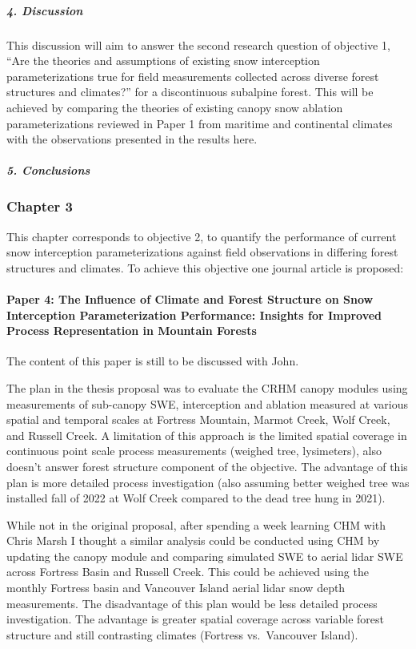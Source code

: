 \documentclass[
  letterpaper,
  DIV=11,
  numbers=noendperiod]{scrartcl}
\let\oldparagraph\paragraph
\renewcommand{\paragraph}[1]{\oldparagraph{#1}\mbox{}}
\let\oldsubparagraph\subparagraph
\renewcommand{\subparagraph}[1]{\oldsubparagraph{#1}\mbox{}}
\begin{document}
\subparagraph{4. Discussion}\label{discussion-2}

This discussion will aim to answer the second research question of
objective 1, ``Are the theories and assumptions of existing snow
interception parameterizations true for field measurements collected
across diverse forest structures and climates?'' for a discontinuous
subalpine forest. This will be achieved by comparing the theories of
existing canopy snow ablation parameterizations reviewed in Paper 1 from
maritime and continental climates with the observations presented in the
results here.

\subparagraph{5. Conclusions}\label{conclusions-1}

\subsubsection{Chapter 3}\label{chapter-3}

This chapter corresponds to objective 2, to quantify the performance of
current snow interception parameterizations against field observations
in differing forest structures and climates. To achieve this objective
one journal article is proposed:

\paragraph{Paper 4: The Influence of Climate and Forest Structure on
Snow Interception Parameterization Performance: Insights for Improved
Process Representation in Mountain
Forests}\label{paper-4-the-influence-of-climate-and-forest-structure-on-snow-interception-parameterization-performance-insights-for-improved-process-representation-in-mountain-forests}

The content of this paper is still to be discussed with John.

The plan in the thesis proposal was to evaluate the CRHM canopy modules
using measurements of sub-canopy SWE, interception and ablation measured
at various spatial and temporal scales at Fortress Mountain, Marmot
Creek, Wolf Creek, and Russell Creek. A limitation of this approach is
the limited spatial coverage in continuous point scale process
measurements (weighed tree, lysimeters), also doesn't answer forest
structure component of the objective. The advantage of this plan is more
detailed process investigation (also assuming better weighed tree was
installed fall of 2022 at Wolf Creek compared to the dead tree hung in
2021).

While not in the original proposal, after spending a week learning CHM
with Chris Marsh I thought a similar analysis could be conducted using
CHM by updating the canopy module and comparing simulated SWE to aerial
lidar SWE across Fortress Basin and Russell Creek. This could be
achieved using the monthly Fortress basin and Vancouver Island aerial
lidar snow depth measurements. The disadvantage of this plan would be
less detailed process investigation. The advantage is greater spatial
coverage across variable forest structure and still contrasting climates
(Fortress vs.~Vancouver Island).
\end{document}
